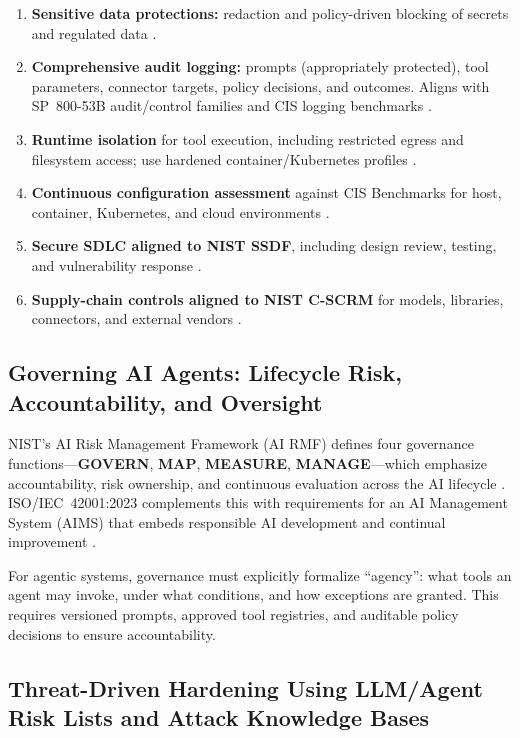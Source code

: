 \begin{TNtwocol}
\begin{enumerate}
            \item \textbf{Sensitive data protections:} redaction and policy-driven blocking of secrets and regulated data \cite{OWASP_LLM_Top10, ISO_27002_2022}.
            \item \textbf{Comprehensive audit logging:} prompts (appropriately protected), tool parameters, connector targets, policy decisions, and outcomes. Aligns with SP~800-53B audit/control families and CIS logging benchmarks \cite{NIST_SP800_53B, CIS_Benchmarks}.
            \item \textbf{Runtime isolation} for tool execution, including restricted egress and filesystem access; use hardened container/Kubernetes profiles \cite{CIS_Benchmarks}.
            \item \textbf{Continuous configuration assessment} against CIS Benchmarks for host, container, Kubernetes, and cloud environments \cite{CIS_Benchmarks}.
            \item \textbf{Secure SDLC aligned to NIST SSDF}, including design review, testing, and vulnerability response \cite{NIST_SP800_218}.
            \item \textbf{Supply-chain controls aligned to NIST C-SCRM} for models, libraries, connectors, and external vendors \cite{NIST_SP800_161R1}.
      \end{enumerate}

      \subsection{Governing AI Agents: Lifecycle Risk, Accountability, and Oversight}

      NIST's AI Risk Management Framework (AI RMF) defines four governance functions—\textbf{GOVERN}, \textbf{MAP}, \textbf{MEASURE}, \textbf{MANAGE}—which emphasize accountability, risk ownership, and continuous evaluation across the AI lifecycle \cite{NIST_AI_RMF_100_1}. ISO/IEC~42001:2023 complements this with requirements for an AI Management System (AIMS) that embeds responsible AI development and continual improvement \cite{ISO_42001_2023}.

      For agentic systems, governance must explicitly formalize “agency”: what tools an agent may invoke, under what conditions, and how exceptions are granted. This requires versioned prompts, approved tool registries, and auditable policy decisions to ensure accountability.

      \subsection{Threat-Driven Hardening Using LLM/Agent Risk Lists and Attack Knowledge Bases}


\end{TNtwocol}
